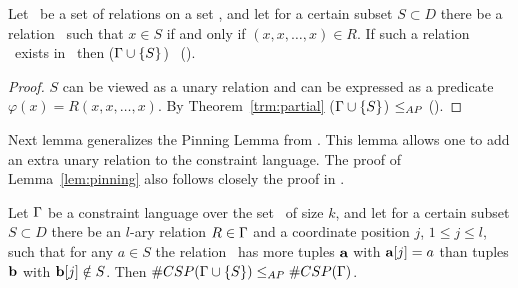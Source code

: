 \begin{lemma}  \label{lem:refpin}
Let \mrelset\ be a set of relations on a set \mD, and let for a certain subset \(S \subset D\)
there be a relation \mR\ such that \(x\in S\) if and only if 
\((x,x,\dotsc,x)\in R\)\@. If such a relation \mR\ exists in \mrelset\ then
\ccsp(\(\Gamma \cup \{{S}\}\)) \maple\ \ccsp(\mrelset)\@.
\end{lemma}

\begin{proof}
\(S\) can be viewed as a unary relation and can be expressed as a predicate 
\(\varphi(x) = R(x,x,\dotsc,x)\)\@. By Theorem~\ref{trm:partial}
\ccsp(\(\Gamma \cup \{{S}\}\)) \(\le_{AP}\) \ccsp(\mrelset)\@.
\end{proof}

Next lemma generalizes the Pinning Lemma from \cite{Trichotomy}.
This lemma allows one to add an extra unary relation to the constraint language. 
The proof of Lemma~\ref{lem:pinning} also follows closely the proof in \cite{Trichotomy}. 

\begin{lemma}\label{lem:pinning}
Let \(\Gamma\) be a constraint language over the set \mD\ of size \(k\)\@,
and let for a certain subset \(S \subset D\) 
there be an \(l\)-ary relation \(R \in \Gamma\) and a coordinate position \(j\),
\(1 \le j \le l\), such that for any \(a\in S\) the relation \mR\ has more tuples
\(\textbf{a}\) with \(\textbf{a}[j]=a\) than tuples \(\textbf{b}\) with
\(\textbf{b}[j] \notin S\)\@. Then \(\#CSP(\Gamma \cup \{{S}\}) \le_{AP} \#CSP(\Gamma)\)\@.
\end{lemma}


